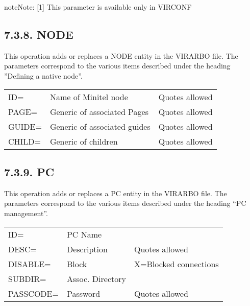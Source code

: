 \documentclass[letterpaper,10pt,english]{sphinxmanual}
\begin{document}
\begin{sphinxadmonition}{note}{Note:}
{[}1{]} This parameter is available only in VIRCONF
\end{sphinxadmonition}


\subsection{7.3.8. NODE}
\label{\detokenize{Installation_Guide:node}}
This operation adds or replaces a NODE entity in the VIRARBO file. The parameters correspond to the various items described under the heading ”Defining a native node”.


\begin{savenotes}\sphinxattablestart
\centering
\begin{tabulary}{\linewidth}[t]{|T|T|T|}
\hline
{}\relax &\relax &\relax \\
\hline
ID=
&
Name of Minitel node
&
Quotes allowed
\\
\hline
PAGE=
&
Generic of associated Pages
&
Quotes allowed
\\
\hline
GUIDE=
&
Generic of associated guides
&
Quotes allowed
\\
\hline
CHILD=
&
Generic of children
&
Quotes allowed
\\
\hline
\end{tabulary}
\par
\sphinxattableend\end{savenotes}


\subsection{7.3.9. PC}
\label{\detokenize{Installation_Guide:pc}}
This operation adds or replaces a PC entity in the VIRARBO file. The parameters correspond to the various items described under the heading “PC management”.


\begin{savenotes}\sphinxattablestart
\centering
\begin{tabulary}{\linewidth}[t]{|T|T|T|}
\hline
{}\relax &\relax &\relax \\
\hline
ID=
&
PC Name
&\\
\hline
DESC=
&
Description
&
Quotes allowed
\\
\hline
DISABLE=
&
Block
&
X=Blocked connections
\\
\hline
SUBDIR=
&
Assoc. Directory
&\\
\hline
PASSCODE=
&
Password
&
Quotes allowed
\\
\hline
\end{tabulary}
\par
\sphinxattableend\end{savenotes}
\end{document}
